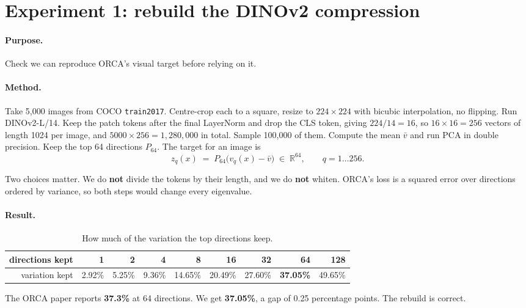 \documentclass[11pt]{article}
\newcommand{\good}[1]{\textcolor{green!45!black}{#1}}
\begin{document}
\section{Experiment 1: rebuild the DINOv2 compression}

\paragraph{Purpose.} Check we can reproduce ORCA's visual target before relying on it.

\paragraph{Method.} Take 5{,}000 images from COCO \texttt{train2017}. Centre-crop each to a square,
resize to $224\times224$ with bicubic interpolation, no flipping. Run DINOv2-L/14. Keep the patch
tokens after the final LayerNorm and drop the CLS token, giving $224/14 = 16$, so $16\times16 = 256$
vectors of length 1024 per image, and $5000 \times 256 = 1{,}280{,}000$ in total. Sample 100{,}000 of
them. Compute the mean $\bar v$ and run PCA in double precision. Keep the top 64 directions $P_{64}$.
The target for an image is
\begin{equation}
z_q(x) \;=\; P_{64}\bigl(v_q(x) - \bar v\bigr) \;\in\; \mathbb{R}^{64},
\qquad q = 1 \dots 256 .
\end{equation}

Two choices matter. We do \textbf{not} divide the tokens by their length, and we do \textbf{not}
whiten. ORCA's loss is a squared error over directions ordered by variance, so both steps would
change every eigenvalue.

\paragraph{Result.}

\begin{table}[h]
\centering
\caption{How much of the variation the top directions keep.}
\begin{tabular}{@{}rrrrrrrrr@{}}
\toprule
directions kept & 1 & 2 & 4 & 8 & 16 & 32 & \textbf{64} & 128 \\
\midrule
variation kept & 2.92\% & 5.25\% & 9.36\% & 14.65\% & 20.49\% & 27.60\% & \good{\textbf{37.05\%}} & 49.65\% \\
\bottomrule
\end{tabular}
\end{table}

\noindent
The ORCA paper reports \textbf{37.3\%} at 64 directions. We get \textbf{37.05\%}, a gap of
0.25 percentage points. The rebuild is correct.
\end{document}
